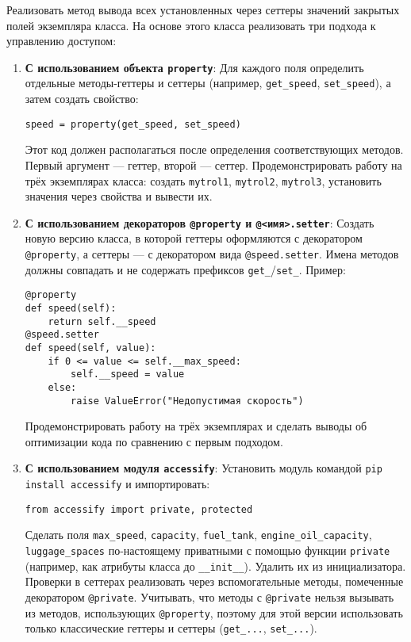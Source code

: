 \begin{enumerate}
\begin{itemize}
\end{itemize}
Реализовать метод вывода всех установленных через сеттеры значений закрытых полей экземпляра класса.
На основе этого класса реализовать три подхода к управлению доступом:
\begin{enumerate}
    \item \textbf{С использованием объекта \texttt{property}}:  
    Для каждого поля определить отдельные методы-геттеры и сеттеры (например, \texttt{get\_speed}, \texttt{set\_speed}), а затем создать свойство:  
    \begin{verbatim}
speed = property(get_speed, set_speed)
    \end{verbatim}  
    Этот код должен располагаться после определения соответствующих методов. Первый аргумент — геттер, второй — сеттер.  
    Продемонстрировать работу на трёх экземплярах класса: создать \texttt{mytrol1}, \texttt{mytrol2}, \texttt{mytrol3}, установить значения через свойства и вывести их.
    \item \textbf{С использованием декораторов \texttt{@property} и \texttt{@<имя>.setter}}:  
    Создать новую версию класса, в которой геттеры оформляются с декоратором \texttt{@property}, а сеттеры — с декоратором вида \texttt{@speed.setter}. Имена методов должны совпадать и не содержать префиксов \texttt{get\_}/\texttt{set\_}.  
    Пример:  
    \begin{verbatim}
@property
def speed(self):
    return self.__speed
@speed.setter
def speed(self, value):
    if 0 <= value <= self.__max_speed:
        self.__speed = value
    else:
        raise ValueError("Недопустимая скорость")
    \end{verbatim}  
    Продемонстрировать работу на трёх экземплярах и сделать выводы об оптимизации кода по сравнению с первым подходом.
    \item \textbf{С использованием модуля \texttt{accessify}}:  
    Установить модуль командой \texttt{pip install accessify} и импортировать:  
    \begin{verbatim}
from accessify import private, protected
    \end{verbatim}  
    Сделать поля \texttt{max\_speed}, \texttt{capacity}, \texttt{fuel\_tank}, \texttt{engine\_oil\_capacity}, \texttt{luggage\_spaces} по-настоящему приватными с помощью функции \texttt{private} (например, как атрибуты класса до \texttt{\_\_init\_\_}). Удалить их из инициализатора.  
    Проверки в сеттерах реализовать через вспомогательные методы, помеченные декоратором \texttt{@private}.  
    Учитывать, что методы с \texttt{@private} нельзя вызывать из методов, использующих \texttt{@property}, поэтому для этой версии использовать только классические геттеры и сеттеры (\texttt{get\_...}, \texttt{set\_...}).  

\end{enumerate}
\end{enumerate}

